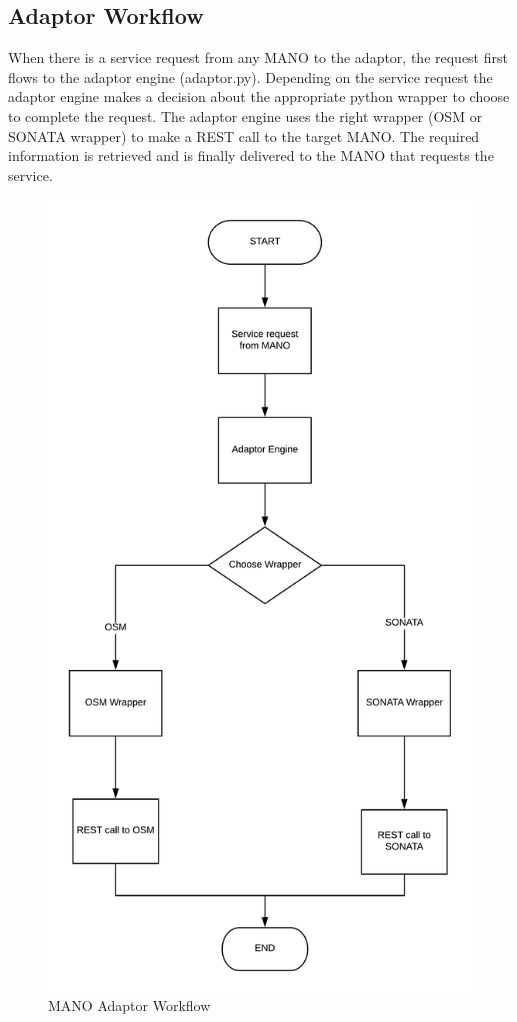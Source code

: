 \subsection{Adaptor Workflow}
When there is a service request from any MANO to the adaptor, the request first flows to the adaptor engine (adaptor.py). Depending on the service request the adaptor engine makes a decision about the appropriate python wrapper to choose to complete the request. The adaptor engine uses the right wrapper (OSM or SONATA wrapper) to make a REST call to the target MANO. The required information is  retrieved and is finally delivered to the MANO that requests the service.
\begin{figure}
	\centering
	\includegraphics[width=0.7\linewidth]{figures/MA_Workflow}
	\caption{MANO Adaptor Workflow}
	\label{fig:maworkflow}
\end{figure}

